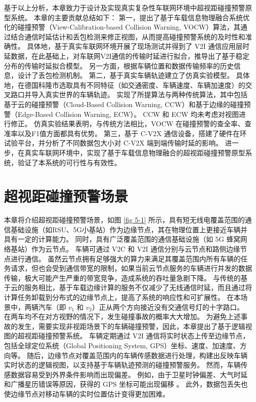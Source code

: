 基于以上分析，本章致力于设计及实现真实复杂性车联网环境中超视距碰撞预警原型系统。
本章的主要贡献总结如下：
第一，提出了基于车载信息物理融合系统优化的碰撞预警（View-Calibration-based Collision Warning, VOCW）算法，其通过结合通信时延估计和丢包检测来修正视图，从而提高碰撞预警系统的及时性和准确性。
具体地，基于真实车联网环境开展了现场测试并得到了 V2I 通信应用层时延数据，在此基础上，对车联网V2I通信的传输时延进行拟合，推导出了基于稳定分布的传输时延拟合模型。
另一方面，根据车辆位置和数据传输频率的历史信息，设计了丢包检测机制。
第二，基于真实车辆轨迹建立了仿真实验模型。
具体地，在德国科隆市选取具有不同特征（如交通密度、车辆速度、车辆加速度）的交叉路口并导入真实世界的车辆轨迹。
实现了所提算法与两种传统算法，其中包括基于云的碰撞预警（Cloud-Based Collision Warning, CCW）和基于边缘的碰撞预警（Edge-Based Collision Warning, ECW）。
CCW 和 ECW 均未考虑对视图进行修正。
仿真实验结果表明，与传统方法相比，VOCW 在碰撞预警的查全率、查准率以及F1值方面都具有优势。
第三，基于 C-V2X 通信设备，搭建了硬件在环试验平台，并分析了不同数据包大小对 C-V2X 端到端传输时延的影响。
进一步，在真实车联网环境中，实现了基于车载信息物理融合的超视距碰撞预警原型系统，验证了本系统的可行性与有效性。

\section[\hspace{-2pt}超视距碰撞预警场景]{{ \hspace{-8pt}超视距碰撞预警场景}}\label{section 5-2}

本章将介绍超视距碰撞预警场景，如图 \ref{fig 5-1} 所示，具有短无线电覆盖范围的通信基础设施（如RSU、5G小基站）作为边缘节点，其在物理位置上更接近车辆并具有一定的计算能力。
同时，具有广泛覆盖范围的通信基础设施（如 5G 蜂窝网络基站）作为云节点。
车辆可通过 V2C 和 V2I 通信分别与云节点和路侧边缘节点进行通信。
虽然云节点拥有足够强大的算力来满足其覆盖范围内所有车辆的任务请求，但也会受到通信带宽的限制，如果当前云节点服务的车辆进行并发的数据传输，极大可能产生严重的带宽竞争，造成系统的吞吐量急剧下降。
与传统的基于云的服务相比，基于车载边缘计算的服务不仅减少了无线通信时延，而且通过将计算任务卸载到分布式的边缘节点上，提高了系统的响应性和可扩展性。
在本场景中，两辆汽车（即 $v_1$ 和 $v_2$）正从两个方向接近没有交通信号灯的十字路口。
在两车均不在对方视野的情况下，发生碰撞事故的概率大大增加。
为避免上述事故的发生，需要实现非视距场景下的车辆碰撞预警，因此，本章提出了基于逻辑视图的超视距碰撞预警系统。
车辆定期通过 V2I 通信将实时状态上传至边缘节点，包括全球定位系统（Global Positioning System, GPS）坐标、速度、加速度、方向等。
随后，边缘节点对覆盖范围内的车辆传感数据进行处理，构建出反映车辆实时状态的逻辑视图，以支持基于车辆轨迹预测的碰撞预警服务。
然而，车辆传感数据容易受到外界条件影响而出现偏差。
例如，由于卫星时钟偏差、大气时延和广播星历错误等原因，获得的 GPS 坐标可能出现偏移 \cite{liu2013improving}。
此外，数据包丢失也使边缘节点对移动车辆的实时位置估计变得更加困难。

